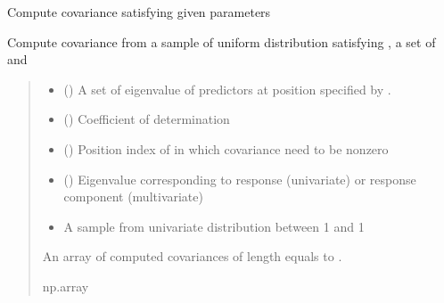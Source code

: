 \documentclass[letterpaper,10pt,english]{sphinxmanual}
\begin{document}

\begin{fulllineitems}
\label{\detokenize{Utilities:pysimrel.utilities.sample_cov}}
\pysigstartsignatures
{}
\pysigstopsignatures
\sphinxAtStartPar
Compute covariance satisfying given parameters

\sphinxAtStartPar
Compute covariance from a sample of uniform distribution satisfying , a set of  and 
\begin{quote}\begin{description}
\begin{itemize}
\item {} 
\sphinxAtStartPar
{} () \textendash{} A set of eigenvalue of predictors at position specified by .

\item {} 
\sphinxAtStartPar
{} () \textendash{} Coefficient of determination

\item {} 
\sphinxAtStartPar
{} () \textendash{} Position index of in which covariance need to be non\sphinxhyphen{}zero

\item {} 
\sphinxAtStartPar
{} () \textendash{} Eigenvalue corresponding to response (univariate) or response component (multivariate)

\item {} 
\sphinxAtStartPar
{} \textendash{} A sample from univariate distribution between \sphinxhyphen{}1 and 1

\end{itemize}

\sphinxAtStartPar
An array of computed covariances of length equals to .

\sphinxAtStartPar
np.array

\end{description}\end{quote}

\end{fulllineitems}
\end{document}
